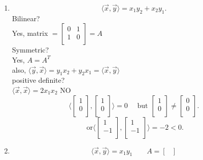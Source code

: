 \documentclass{report}
\begin{document}
  \begin{enumerate} [label=(\alph*)]
    \item 
     \[
     \langle \vec{ x} ,\vec{ y}   \rangle = x_1 y_2 + x_2 y_1
     .\] 
     Bilinear?\\
     Yes, matrix $ = \begin{bmatrix}
     0 & 1\\
     1 & 0\\
     \end{bmatrix} = A$ \\
     Symmetric?\\
     Yes, $ A = A ^{T}$\\
     also, $ \langle \vec{ y} ,\vec{ x}   \rangle = y_1 x_2 + y_2 x_1 = \langle \vec{ x} ,\vec{ y}   \rangle $ \\
     positive definite?\\
     $ \langle \vec{ x} , \vec{ x}   \rangle = 2 x_1 x_2$ NO\\
     \[
     \langle  \begin{bmatrix}
     1\\
     0\\
     \end{bmatrix}
     , \begin{bmatrix}
     1\\
     0\\
     \end{bmatrix}
       \rangle =0  \quad \text{ but } \begin{bmatrix}
       1\\
       0\\
       \end{bmatrix}
        \neq \begin{bmatrix}
        0\\
        0\\
        \end{bmatrix}
     .\] 
     \[
     \text{ or}               \langle \begin{bmatrix}
     1\\
     -1\\
     \end{bmatrix}
     , \begin{bmatrix}
     1\\
     -1\\
     \end{bmatrix}
       \rangle = -2 < 0
     .\] 
    \item 
     \[
     \langle \vec{ x} ,\vec{ y}   \rangle =x_1 y_1 \qquad  A = \begin{bmatrix}

\end{bmatrix}\]
\end{enumerate}
\end{document}
